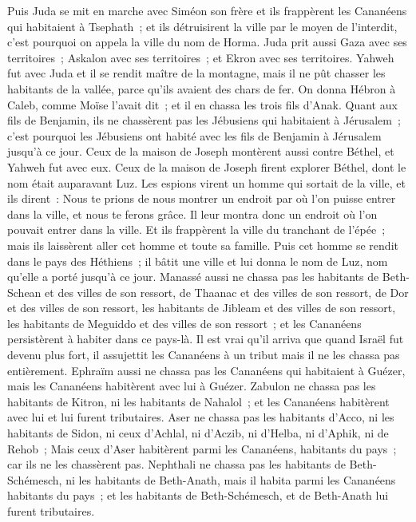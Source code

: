 \begin{multicols}{2}
Puis Juda se mit en marche avec Siméon son frère et ils frappèrent les Cananéens qui habitaient à Tsephath~; et ils détruisirent la ville par le moyen de l'interdit, c'est pourquoi on appela la ville du nom de Horma.
Juda prit aussi Gaza avec ses territoires~; Askalon avec ses territoires~; et Ekron avec ses territoires.
Yahweh fut avec Juda et il se rendit maître de la montagne, mais il ne pût chasser les habitants de la vallée, parce qu'ils avaient des chars de fer.
On donna Hébron à Caleb, comme Moïse l'avait dit~; et il en chassa les trois fils d'Anak.
Quant aux fils de Benjamin, ils ne chassèrent pas les Jébusiens qui habitaient à Jérusalem~; c'est pourquoi les Jébusiens ont habité avec les fils de Benjamin à Jérusalem jusqu'à ce jour.
Ceux de la maison de Joseph montèrent aussi contre Béthel, et Yahweh fut avec eux.
Ceux de la maison de Joseph firent explorer Béthel, dont le nom était auparavant Luz.
Les espions virent un homme qui sortait de la ville, et ils dirent~: Nous te prions de nous montrer un endroit par où l'on puisse entrer dans la ville, et nous te ferons grâce.
Il leur montra donc un endroit où l'on pouvait entrer dans la ville. Et ils frappèrent la ville du tranchant de l'épée~; mais ils laissèrent aller cet homme et toute sa famille.
Puis cet homme se rendit dans le pays des Héthiens~; il bâtit une ville et lui donna le nom de Luz, nom qu'elle a porté jusqu'à ce jour.
Manassé aussi ne chassa pas les habitants de Beth-Schean et des villes de son ressort, de Thaanac et des villes de son ressort, de Dor et des villes de son ressort, les habitants de Jibleam et des villes de son ressort, les habitants de Meguiddo et des villes de son ressort~; et les Cananéens persistèrent à habiter dans ce pays-là.
Il est vrai qu'il arriva que quand Israël fut devenu plus fort, il assujettit les Cananéens à un tribut mais il ne les chassa pas entièrement.
Ephraïm aussi ne chassa pas les Cananéens qui habitaient à Guézer, mais les Cananéens habitèrent avec lui à Guézer.
Zabulon ne chassa pas les habitants de Kitron, ni les habitants de Nahalol~; et les Cananéens habitèrent avec lui et lui furent tributaires.
Aser ne chassa pas les habitants d'Acco, ni les habitants de Sidon, ni ceux d'Achlal, ni d'Aczib, ni d'Helba, ni d'Aphik, ni de Rehob~;
Mais ceux d'Aser habitèrent parmi les Cananéens, habitants du pays~; car ils ne les chassèrent pas.
Nephthali ne chassa pas les habitants de Beth-Schémesch, ni les habitants de Beth-Anath, mais il habita parmi les Cananéens habitants du pays~; et les habitants de Beth-Schémesch, et de Beth-Anath lui furent tributaires.

\end{multicols}

